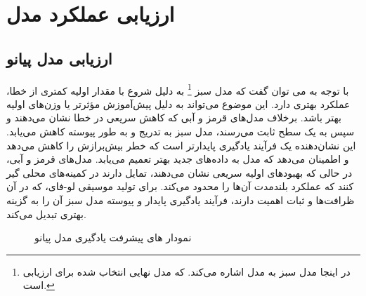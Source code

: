 \section{ارزیابی عملکرد مدل}
\subsection{ارزیابی مدل پیانو}

با توجه به  می توان گفت که مدل سبز \footnote{در اینجا مدل سبز به مدل   اشاره می‌کند. که مدل نهایی انتخاب شده برای ارزیابی است.} به دلیل شروع با مقدار اولیه کمتری از خطا، عملکرد بهتری دارد. این موضوع می‌تواند به دلیل پیش‌آموزش مؤثرتر یا وزن‌های اولیه بهتر باشد. برخلاف مدل‌های قرمز و آبی که کاهش سریعی در خطا نشان می‌دهند و سپس به یک سطح ثابت می‌رسند، مدل سبز به تدریج و به طور پیوسته کاهش می‌یابد. این نشان‌دهنده یک فرآیند یادگیری پایدارتر است که خطر بیش‌برازش را کاهش می‌دهد و اطمینان می‌دهد که مدل به داده‌های جدید بهتر تعمیم می‌یابد. مدل‌های قرمز و آبی، در حالی که بهبودهای اولیه سریعی نشان می‌دهند، تمایل دارند در کمینه‌های محلی گیر کنند که عملکرد بلندمدت آن‌ها را محدود می‌کند. برای تولید موسیقی لو-فای، که در آن ظرافت‌ها و ثبات اهمیت دارند، فرآیند یادگیری پایدار و پیوسته مدل سبز آن را به گزینه بهتری تبدیل می‌کند.

\begin{figure}%
      \centering
      \qquad
      \caption{نمودار های پیشرفت یادگیری مدل پیانو}%
      \label{Fig:lrpi}%
\end{figure}


